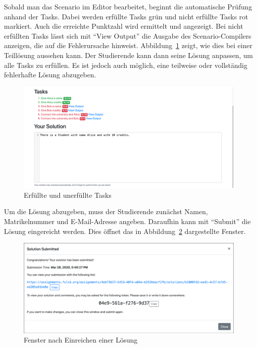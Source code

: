 Sobald man das Scenario im Editor bearbeitet, beginnt die automatische Prüfung anhand der Tasks.
Dabei werden erfüllte Tasks grün und nicht erfüllte Tasks rot markiert.
Auch die erreichte Punktzahl wird ermittelt und angezeigt.
Bei nicht erfüllten Tasks lässt sich mit ``View Output'' die Ausgabe des Scenario-Compilers anzeigen, die auf die Fehlerursache hinweist.
Abbildung~\ref{fig:solve-tasks} zeigt, wie dies bei einer Teillösung aussehen kann.
Der Studierende kann dann seine Lösung anpassen, um alle Tasks zu erfüllen.
Es ist jedoch auch möglich, eine teilweise oder vollständig fehlerhafte Lösung abzugeben.

\begin{figure}
    \centering
    \includegraphics[width=\textwidth]{chapter/fulib.org/img/solve-tasks.png}
    \caption{Erfüllte und unerfüllte Tasks}
    \label{fig:solve-tasks}
\end{figure}

Um die Lösung abzugeben, muss der Studierende zunächst Namen, Matrikelnummer und E-Mail-Adresse angeben.
Daraufhin kann mit ``Submit'' die Lösung eingereicht werden.
Dies öffnet das in Abbildung~\ref{fig:solution-submitted} dargestellte Fenster.

\begin{figure}
    \centering
    \includegraphics[width=\textwidth]{chapter/fulib.org/img/solution-submitted.png}
    \caption{Fenster nach Einreichen einer Lösung}
    \label{fig:solution-submitted}
\end{figure}

